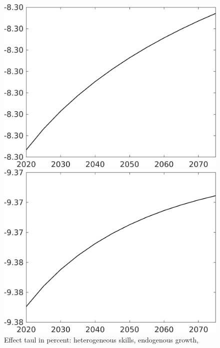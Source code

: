 \documentclass[12pt]{article}
\begin{document}
\begin{figure}[h!!]
	\centering
	\caption{Effect taul in percent: heterogeneous skills, endogenous growth,}\label{fig:LF_BAU_nsk0_xgr03}
	\begin{minipage}[]{0.32\textwidth}
		\includegraphics[width=1\textwidth]{../../codding_model/own_basedOnFried/optimalPol_010922_revision/figures/all_13Sept22/CompTaul_LFBAUPer_Reg0_Lf_spillover0_nsk0_xgr0_knspil0_sep1_countec0_GovRev0_etaa0.79.png}
	\end{minipage}	
	\begin{minipage}[]{0.32\textwidth}
		\includegraphics[width=1\textwidth]{../../codding_model/own_basedOnFried/optimalPol_010922_revision/figures/all_13Sept22/CompTaul_LFBAUPer_Reg0_Lg_spillover0_nsk0_xgr0_knspil0_sep1_countec0_GovRev0_etaa0.79.png}

\end{minipage}
\end{figure}
\end{document}
